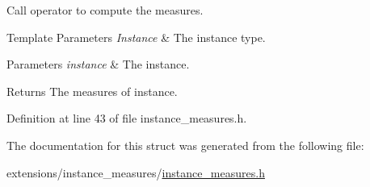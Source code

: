 Call operator to compute the measures. 


\begin{DoxyTemplParams}{Template Parameters}
{\em Instance} & The instance type. \\
\hline
\end{DoxyTemplParams}

\begin{DoxyParams}{Parameters}
{\em instance} & The instance. \\
\hline
\end{DoxyParams}
\begin{DoxyReturn}{Returns}
The measures of {\ttfamily instance}. 
\end{DoxyReturn}


Definition at line 43 of file instance\+\_\+measures.\+h.



The documentation for this struct was generated from the following file\+:\begin{DoxyCompactItemize}
\item 
extensions/instance\+\_\+measures/\hyperlink{instance__measures_8h}{instance\+\_\+measures.\+h}\end{DoxyCompactItemize}
